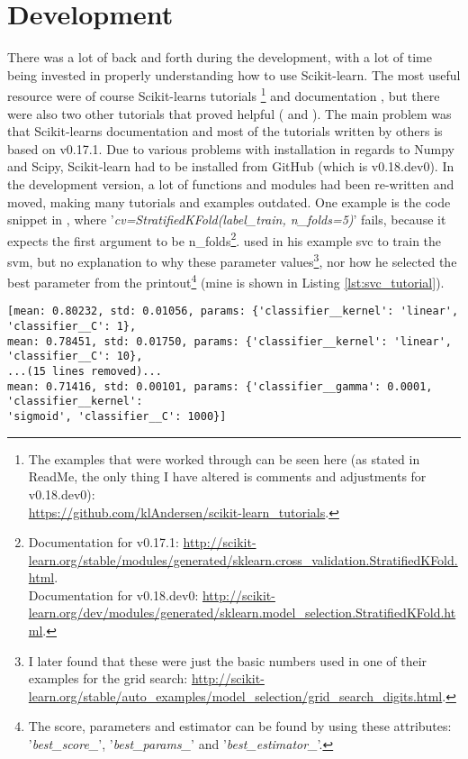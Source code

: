 \section{Development}
\label{sec:development}
There was a lot of back and forth during the development, with a lot of time being invested in properly understanding how to use Scikit-learn.
The most useful resource were of course Scikit-learns tutorials \cite{Scikitlearn.org2016j}\footnote{
	The examples that were worked through can be seen here (as stated in ReadMe, the only thing I have altered is comments and adjustments for v0.18.dev0): \\
	\url{https://github.com/klAndersen/scikit-learn_tutorials}.
	} and documentation \cite{Scikitlearn.org2016,Scikitlearn.org2016h}, 
but there were also two other tutorials that proved helpful (\cite{Rehurek2014} and \cite{Elahi2016}).
The main problem was that Scikit-learns documentation and most of the tutorials written by others is based on v0.17.1.
Due to various problems with installation in regards to Numpy and Scipy, Scikit-learn had to be installed from GitHub (which is v0.18.dev0).
In the development version, a lot of functions and modules had been re-written and moved, making many tutorials and examples outdated.
One example is the code snippet in \cite["In $\lbrack$42$\rbrack$"]{Rehurek2014}, where '\emph{cv=StratifiedKFold(label\_train, n\_folds=5)}' fails, 
because it expects the first argument to be n\_folds\footnote{
	Documentation for v0.17.1: 
	\url{http://scikit-learn.org/stable/modules/generated/sklearn.cross_validation.StratifiedKFold.html}. \\
	Documentation for v0.18.dev0: 
	\url{http://scikit-learn.org/dev/modules/generated/sklearn.model_selection.StratifiedKFold.html}.
}.
\vspace{0.5em}\newline
\textcite{Rehurek2014} used in his example \gls{svc} to train the \gls{svm}, but no explanation to why these parameter values\footnote{
	I later found that these were just the basic numbers used in one of their examples for the grid search: 
	\url{http://scikit-learn.org/stable/auto_examples/model_selection/grid_search_digits.html}.
},
nor how he selected the best parameter from the printout\footnote{
	The score, parameters and estimator can be found by using these attributes: '\emph{best\_score\_}', '\emph{best\_params\_}' and '\emph{best\_estimator\_}'.
} (mine is shown in Listing \ref{lst:svc_tutorial}).

\begin{lstlisting}[caption={Output from SVC tutorial (testing with linear, rbf and sigmoid)}, label={lst:svc_tutorial}] 
[mean: 0.80232, std: 0.01056, params: {'classifier__kernel': 'linear', 'classifier__C': 1}, 
mean: 0.78451, std: 0.01750, params: {'classifier__kernel': 'linear', 'classifier__C': 10}, 
...(15 lines removed)...
mean: 0.71416, std: 0.00101, params: {'classifier__gamma': 0.0001, 'classifier__kernel': 
'sigmoid', 'classifier__C': 1000}]
\end{lstlisting}

